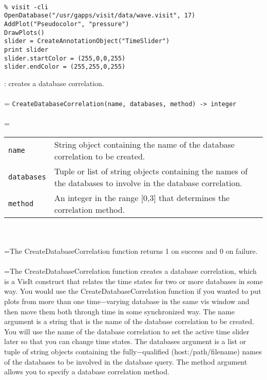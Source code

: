 \documentclass[10pt,a4paper]{report}
\begin{document}
\\[-6mm]
\begin{verbatim}% visit -cli
OpenDatabase("/usr/gapps/visit/data/wave.visit", 17)
AddPlot("Pseudocolor", "pressure")
DrawPlots()
slider = CreateAnnotationObject("TimeSlider")
print slider
slider.startColor = (255,0,0,255)
slider.endColor = (255,255,0,255)
\end{verbatim}
\newpage


{}
: creates a database correlation.\\[-3mm]

 \\ 
\hangindent=\parindent 
\verb!CreateDatabaseCorrelation(name, databases, method) -> integer!\\ [-3mm]

 \\ 
\hangindent=\parindent 
\begin{tabular}{lp{9cm}}
\verb!name! & String object containing the name of the database correlation to be created. \\
\verb!databases! & Tuple or list of string objects containing the names of the databases to involve in the database correlation. \\
\verb!method! & An integer in the range [0,3] that determines the correlation method. \\
\end{tabular} \\[-2mm]


 \\ 
\hangindent=\parindent The CreateDatabaseCorrelation function returns 1 on success and 0 on failure. \\[-3mm] 

 \\ 
\hangindent=\parindent The CreateDatabaseCorrelation function creates a database correlation, which is a VisIt construct that relates the time states for two or more databases in some way. You would use the CreateDatabaseCorrelation function if you wanted to put plots from more than one time$-$varying database in the same vis window and then move them both through time in some synchronized way. The name argument is a string that is the name of the database correlation to be created. You will use the name of the database correlation to set the active time slider later so that you can change time states. The databases argument is a list or tuple of string objects containing the fully$-$qualified (host:/path/filename) names of the databases to be involved in the database query. The method argument allows you to specify a database correlation method. \\
\end{document}
